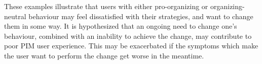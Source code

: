 These examples illustrate that users with either pro-organizing or organizing-neutral behaviour may feel dissatisfied with their strategies, and want to change them in some way.  It is hypothesized that an ongoing need to change one's behaviour, combined with an inability to achieve the change, may contribute to poor PIM user experience.  This may be exacerbated if the symptoms which make the user want to perform the change get worse in the meantime.





